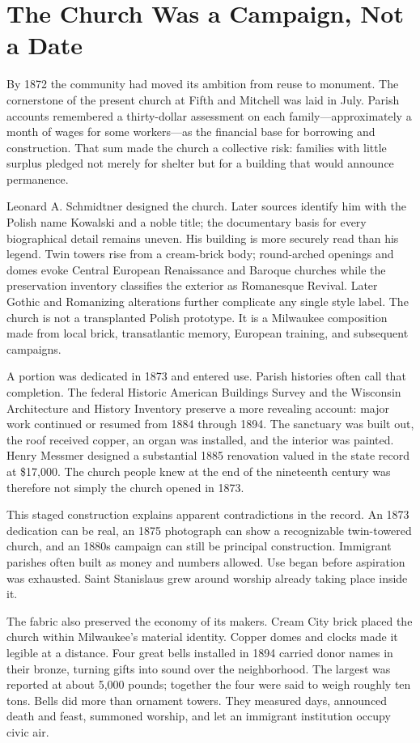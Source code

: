 \section{The Church Was a Campaign, Not a Date}

By 1872 the community had moved its ambition from reuse to monument. The cornerstone of the present church at Fifth and Mitchell was laid in July. Parish accounts remembered a thirty-dollar assessment on each family---approximately a month of wages for some workers---as the financial base for borrowing and construction. That sum made the church a collective risk: families with little surplus pledged not merely for shelter but for a building that would announce permanence.

Leonard A. Schmidtner designed the church. Later sources identify him with the Polish name Kowalski and a noble title; the documentary basis for every biographical detail remains uneven. His building is more securely read than his legend. Twin towers rise from a cream-brick body; round-arched openings and domes evoke Central European Renaissance and Baroque churches while the preservation inventory classifies the exterior as Romanesque Revival. Later Gothic and Romanizing alterations further complicate any single style label. The church is not a transplanted Polish prototype. It is a Milwaukee composition made from local brick, transatlantic memory, European training, and subsequent campaigns.

A portion was dedicated in 1873 and entered use. Parish histories often call that completion. The federal Historic American Buildings Survey and the Wisconsin Architecture and History Inventory preserve a more revealing account: major work continued or resumed from 1884 through 1894. The sanctuary was built out, the roof received copper, an organ was installed, and the interior was painted. Henry Messmer designed a substantial 1885 renovation valued in the state record at \$17,000. The church people knew at the end of the nineteenth century was therefore not simply the church opened in 1873.

This staged construction explains apparent contradictions in the record. An 1873 dedication can be real, an 1875 photograph can show a recognizable twin-towered church, and an 1880s campaign can still be principal construction. Immigrant parishes often built as money and numbers allowed. Use began before aspiration was exhausted. Saint Stanislaus grew around worship already taking place inside it.

The fabric also preserved the economy of its makers. Cream City brick placed the church within Milwaukee's material identity. Copper domes and clocks made it legible at a distance. Four great bells installed in 1894 carried donor names in their bronze, turning gifts into sound over the neighborhood. The largest was reported at about 5,000 pounds; together the four were said to weigh roughly ten tons. Bells did more than ornament towers. They measured days, announced death and feast, summoned worship, and let an immigrant institution occupy civic air.

